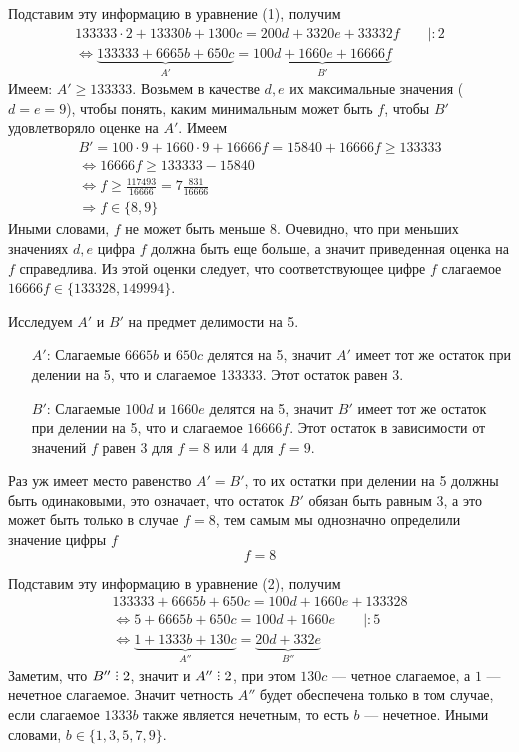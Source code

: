 \documentclass[12pt]{article}
\DeclareRobustCommand{\divby}{%
  \mathrel{\vbox{\baselineskip.65ex\lineskiplimit0pt\hbox{.}\hbox{.}\hbox{.}}}%
}
\begin{document}
    Подставим эту информацию в уравнение (1), получим
    \begin{gather}
        133333\cdot2 + 13330b + 1300c = 200d + 3320e + 33332f \qquad |:2 \nonumber \\
        \Longleftrightarrow \underbrace{133333 + 6665b + 650c}_{A'} = \underbrace{100d + 1660e + 16666f}_{B'}
    \end{gather}
    Имеем: $A' \geqslant 133333$. Возьмем в качестве $d, e$ их максимальные значения ($d = e = 9$), чтобы понять, каким минимальным может быть $f$, чтобы $B'$ удовлетворяло оценке на $A'$. Имеем 
    \begin{gather*}
        B' = 100\cdot9 + 1660\cdot9 + 16666f = 15840 + 16666f \geqslant 133333 \\
        \Longleftrightarrow 16666f \geqslant 133333 - 15840 \\
        \Longleftrightarrow f \geqslant \frac{117493}{16666} = 7\frac{831}{16666} \\
        \Longrightarrow f \in \{8, 9\}
    \end{gather*}
    Иными словами, $f$ не может быть меньше 8. Очевидно, что при меньших значениях $d, e$ цифра $f$ должна быть еще больше, а значит приведенная оценка на $f$ справедлива.
    Из этой оценки следует, что соответствующее цифре $f$ слагаемое $16666f \in \{133328, 149994\}$.

    Исследуем $A'$ и $B'$ на предмет делимости на 5. 
    \begin{itemize}
        \item[$A'$:] Слагаемые $6665b$ и $650c$ делятся на 5, значит $A'$ имеет тот же остаток при делении на 5, что и слагаемое 133333.
        Этот остаток равен 3.
        \item[$B'$:] Слагаемые $100d$ и $1660e$ делятся на 5, значит $B'$ имеет тот же остаток при делении на 5, что и слагаемое $16666f$.
        Этот остаток в зависимости от значений $f$ равен 3 для $f = 8$ или 4 для $f = 9$.
    \end{itemize}
    Раз уж имеет место равенство $A' = B'$, то их остатки при делении на 5 должны быть одинаковыми, это означает, что остаток $B'$ обязан быть равным 3, а это может быть только в случае $f = 8$, тем самым мы однозначно определили значение цифры $f$
    $$
        \boxed{f = 8}
    $$

    Подставим эту информацию в уравнение (2), получим
    \begin{gather}
        133333 + 6665b + 650c = 100d + 1660e + 133328 \nonumber \\
        \Longleftrightarrow 5 + 6665b + 650c = 100d + 1660e \qquad |:5 \nonumber \\
        \Longleftrightarrow \underbrace{1 + 1333b + 130c}_{A''} = \underbrace{20d + 332e}_{B''}
    \end{gather}
    Заметим, что $B'' \divby 2$, значит и $A'' \divby 2$, при этом $130c$ — четное слагаемое, а $1$ — нечетное слагаемое.
    Значит четность $A''$ будет обеспечена только в том случае, если слагаемое $1333b$ также является нечетным, то есть $b$ — нечетное. Иными словами, $b \in \{1, 3, 5, 7, 9\}$.
\end{document}
